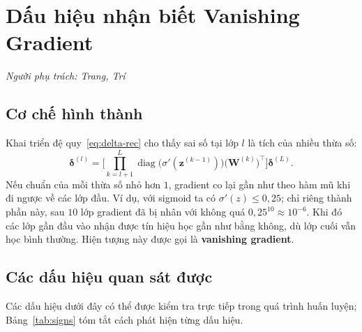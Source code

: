 \documentclass[12pt]{article}
\begin{document}
\section{Dấu hiệu nhận biết Vanishing Gradient}
\label{sec:vanishing}
\textit{Người phụ trách: Trang, Trí}

\subsection{Cơ chế hình thành}
Khai triển đệ quy~\eqref{eq:delta-rec} cho thấy sai số tại lớp $l$ là tích của nhiều thừa số:
\begin{equation}
    \boldsymbol{\delta}^{(l)}
    =\Biggl[\prod_{k=l+1}^{L}\operatorname{diag}\!\bigl(\sigma'(\mathbf{z}^{(k-1)})\bigr)\bigl(\mathbf{W}^{(k)}\bigr)^{\!\top}\Biggr]\boldsymbol{\delta}^{(L)}.
    \label{eq:product}
\end{equation}
Nếu chuẩn của mỗi thừa số nhỏ hơn $1$, gradient co lại gần như theo hàm mũ khi đi ngược về các lớp đầu. Ví dụ, với sigmoid ta có $\sigma'(z)\le 0{,}25$; chỉ riêng thành phần này, sau $10$ lớp gradient đã bị nhân với không quá $0{,}25^{10}\approx 10^{-6}$. Khi đó các lớp gần đầu vào nhận được tín hiệu học gần như bằng không, dù lớp cuối vẫn học bình thường. Hiện tượng này được gọi là \textbf{vanishing gradient}.

\subsection{Các dấu hiệu quan sát được}
Các dấu hiệu dưới đây có thể được kiểm tra trực tiếp trong quá trình huấn luyện; Bảng~\ref{tab:signs} tóm tắt cách phát hiện từng dấu hiệu.
\end{document}
